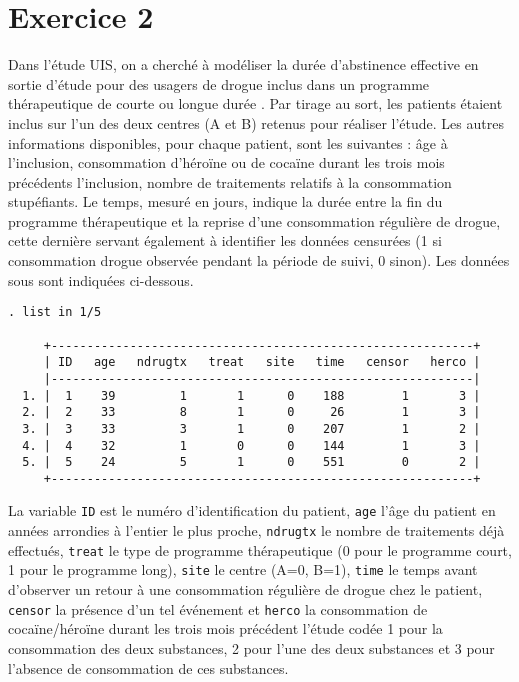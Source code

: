 \section*{Exercice 2}
Dans l'étude UIS, on a cherché à modéliser la durée d'abstinence effective
en sortie d'étude pour des usagers de drogue inclus dans un programme
thérapeutique de courte ou longue durée \cite{hosmer08}. Par tirage au sort,
les patients étaient inclus sur l'un des deux centres (A et B) retenus pour
réaliser l'étude. Les autres informations disponibles, pour chaque patient,
sont les suivantes : âge à l'inclusion, consommation d'héroïne ou de cocaïne
durant les trois mois précédents l'inclusion, nombre de traitements relatifs
à la consommation stupéfiants. Le temps, mesuré en jours, indique la durée
entre la fin du programme thérapeutique et la reprise d'une consommation
régulière de drogue, cette dernière servant également à identifier les
données censurées (1 si consommation drogue observée pendant la période de
suivi, 0 sinon). Les données sous \Stata sont indiquées ci-dessous.
\begin{verbatim}
. list in 1/5

     +-----------------------------------------------------------+
     | ID   age   ndrugtx   treat   site   time   censor   herco |
     |-----------------------------------------------------------|
  1. |  1    39         1       1      0    188        1       3 |
  2. |  2    33         8       1      0     26        1       3 |
  3. |  3    33         3       1      0    207        1       2 |
  4. |  4    32         1       0      0    144        1       3 |
  5. |  5    24         5       1      0    551        0       2 |
     +-----------------------------------------------------------+
\end{verbatim}
La variable \texttt{ID} est le numéro d'identification du patient,
\texttt{age} l'âge du patient en années arrondies à l'entier le plus proche,
\texttt{ndrugtx} le nombre de traitements déjà effectués, \texttt{treat} le
type de programme thérapeutique (0 pour le programme court, 1 pour le
programme long), \texttt{site} le centre (A=0, B=1), \texttt{time} le temps
avant d'observer un retour à une consommation régulière de drogue chez le
patient, \texttt{censor} la présence d'un tel événement et \texttt{herco} la
consommation de cocaïne/héroïne durant les trois mois précédent l'étude
codée 1 pour la consommation des deux substances, 2 pour l'une des deux
substances et 3 pour l'absence de consommation de ces substances. 

